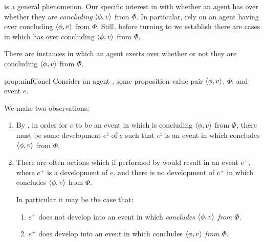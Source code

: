 \begin{note}%
  \nocite{Peacocke:2021aa}%
   is a general phenomenon.
  Our specific interest in with whether an agent has \ninf{} over whether they are \emph{concluding} \(\langle \phi, v \rangle\) from \(\Phi\).
  In particular,  rely on an agent having \ninf{} over concluding \(\langle \phi, v \rangle\) from \(\Phi\).
  Still, before turning to  we establish there are cases in which has \ninf{} over concluding \(\langle \phi, v \rangle\) from \(\Phi\).

  \begin{proposition}%
    \label{prop:ninfConcl}%
    There are instances in which an agent exerts  over whether or not they are concluding \(\langle \phi, v \rangle\) from \(\Phi\).
  \end{proposition}

  \begin{argument}{prop:ninfConcl}
    Consider an agent \vAgent{}, some proposition-value pair \(\langle \phi, v \rangle\), \pool{} \(\Phi\), and event \(e\).

    We make two observations:

    \begin{enumerate}[label=\arabic*., ref=(\arabic*), noitemsep]
    \item
      By , in order for \(e\) to be an event in which \vAgent{} is concluding \(\langle \phi, v \rangle\) from \(\Phi\), there must be some  development \(e^{\sharp}\) of \(e\) such that \(e^{\sharp}\) is an event in which \vAgent{} concludes \(\langle \phi, v \rangle\) from \(\Phi\).
    \item
      There are often actions which if performed by \vAgent{} would result in an event \(e^{+}\), where \(e^{+}\) is a development of \(e\), and there is no  development of \(e^{+}\) in which \vAgent{} concludes \(\langle \phi, v \rangle\) from \(\Phi\).

      In particular it may be the case that:
      \begin{enumerate}[label=\alph*., ref=(\alph*)]
        \label{prop:ninfConcl:obs:2:concludes}
      \item
        \(e^{+}\) does not develop into an event in which \vAgent{} \emph{concludes \(\langle \phi, v \rangle\) from \(\Phi\)}.
      \item
        \label{prop:ninfConcl:obs:2:diffPoll}
        \(e^{+}\) does develop into an event in which \vAgent{} concludes \(\langle \phi, v \rangle\) \emph{from \(\Phi\)}.
      \end{enumerate}
    \end{enumerate}


\end{argument}
\end{note}
